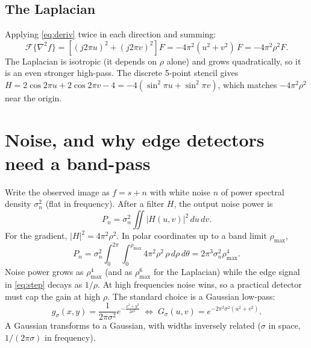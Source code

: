 \documentclass[11pt]{article}
\begin{document}
\subsection{The Laplacian}
Applying \eqref{eq:deriv} twice in each direction and summing:
\begin{equation}
\mathcal{F}\{\nabla^2 f\}=\left[(j2\pi u)^2+(j2\pi v)^2\right]F=-4\pi^2(u^2+v^2)\,F=-4\pi^2\rho^2F. \label{eq:lap}
\end{equation}
The Laplacian is isotropic (it depends on $\rho$ alone) and grows quadratically, so it is an even stronger high-pass. The discrete 5-point stencil gives $H=2\cos2\pi u+2\cos2\pi v-4=-4(\sin^2\pi u+\sin^2\pi v)$, which matches $-4\pi^2\rho^2$ near the origin.

\section{Noise, and why edge detectors need a band-pass}

Write the observed image as $f=s+n$ with white noise $n$ of power spectral density $\sigma_n^2$ (flat in frequency). After a filter $H$, the output noise power is
\begin{equation}
P_n=\sigma_n^2\iint |H(u,v)|^2\,du\,dv .
\end{equation}
For the gradient, $|H|^2=4\pi^2\rho^2$. In polar coordinates up to a band limit $\rho_{\max}$,
\[
P_n=\sigma_n^2\int_0^{2\pi}\!\!\int_0^{\rho_{\max}}4\pi^2\rho^2\,\rho\,d\rho\,d\theta=2\pi^3\sigma_n^2\rho_{\max}^4 .
\]
Noise power grows as $\rho_{\max}^4$ (and as $\rho_{\max}^6$ for the Laplacian) while the edge signal in \eqref{eq:step} decays as $1/\rho$. At high frequencies noise wins, so a practical detector must cap the gain at high $\rho$. The standard choice is a Gaussian low-pass:
\begin{equation}
g_\sigma(x,y)=\frac{1}{2\pi\sigma^2}e^{-\frac{x^2+y^2}{2\sigma^2}}
\;\Longleftrightarrow\;
G_\sigma(u,v)=e^{-2\pi^2\sigma^2(u^2+v^2)} . \label{eq:gauss}
\end{equation}
A Gaussian transforms to a Gaussian, with widths inversely related ($\sigma$ in space, $1/(2\pi\sigma)$ in frequency).
\end{document}
